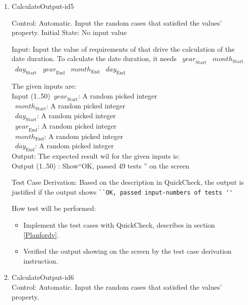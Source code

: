 \documentclass[12pt, titlepage]{article}
\begin{document}
\begin{enumerate}
\item{CalculateOutput-id5\\}

Control: Automatic. Input the random cases that satisfied the values' property.
Initial State: No input value

Input: Input the value of requirements of \progname that drive the calculation
of the date duration. To calculate the date duration, it needs
~$\mathit{year}_\text{Start}$ ~$\mathit{month}_\text{Start}$
~$\mathit{day}_\text{Start}$ ~$\mathit{year}_\text{End}$
~$\mathit{month}_\text{End}$ ~$\mathit{day}_\text{End}$ 

The given inputs are:\\
Input (1..50)~$\mathit{year}_\text{Start}$: A random picked integer\\
~$\mathit{month}_\text{Start}$: A random picked integer\\
~$\mathit{day}_\text{Start}$: A random picked integer\\
~$\mathit{year}_\text{End}$: A random picked integer\\
~$\mathit{month}_\text{End}$: A random picked integer\\
~$\mathit{day}_\text{End}$: A random picked integer\\

Output: The expected result wil for the given inputs is:\\ Output (1..50) :
Show``OK, passed 49 tests '' on the screen\\


Test Case Derivation: Based on the description in QuickCheck\cite{QuickCheck},
the output is justified if the output shows \verb|``OK, passed input-numbers of tests ''|

How test will be performed: 
\begin{itemize}
\item Implement the test cases with QuickCheck\cite{QuickCheck}, describes in 
section \ref{Planfordv}.
\item Verified the output showing on the screen by the test case derivation
instruction.
\end{itemize}

\item{CalculateOutput-id6\\}
Control: Automatic. Input the random cases that satisfied the values' property.


\end{enumerate}
\end{document}
